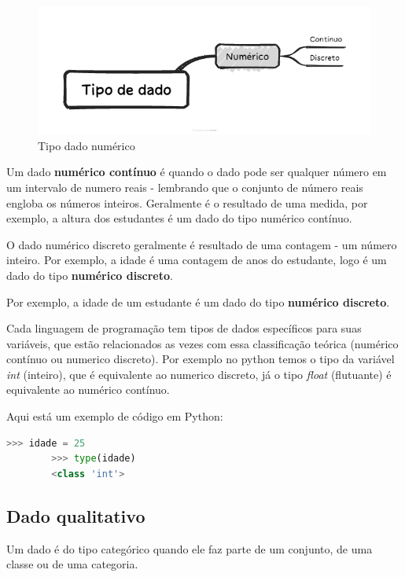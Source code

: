 \documentclass[a4paper,12pt]{book}
\begin{document}
	\begin{figure}[!h]
		\centering
		\includegraphics[width=0.8\linewidth]{figuras/tipo_do_dado_numerico.png}
		\caption{Tipo dado numérico}
		\label{fig:tipodadonumerico}
	\end{figure}
	
	Um dado \textbf{numérico contínuo} é quando o dado pode ser qualquer número em um intervalo de numero reais - lembrando que o conjunto de número reais engloba os números inteiros. Geralmente é o resultado de uma medida, por exemplo, a altura dos estudantes é um dado do tipo numérico contínuo.
	
	O dado numérico discreto geralmente é resultado de uma contagem - um número inteiro. Por exemplo, a idade é uma contagem de anos do estudante, logo é um dado do tipo \textbf{numérico discreto}. 
	
	Por exemplo, a idade de um estudante é um dado do tipo \textbf{numérico discreto}. 
	
	Cada linguagem de programação tem tipos de dados específicos para suas variáveis, que estão relacionados as vezes com essa classificação teórica (numérico contínuo ou numerico discreto). Por exemplo no python temos o tipo da variável \textit{int} (inteiro), que é equivalente ao numerico discreto, já o tipo \textit{float} (flutuante) é equivalente ao numérico contínuo.
	
	Aqui está um exemplo de código em Python:
	
	\begin{lstlisting}[language=Python, caption={Exemplo de declaração de variável do tipo inteiro, equivalente ao tipo de dado numérico contínuo.}]
		>>> idade = 25
		>>> type(idade)
		<class 'int'>
	\end{lstlisting}
		
	\subsection{Dado qualitativo}
	
	Um dado é do tipo categórico quando ele faz parte de um conjunto, de uma classe ou de uma categoria.
	
\end{document}
